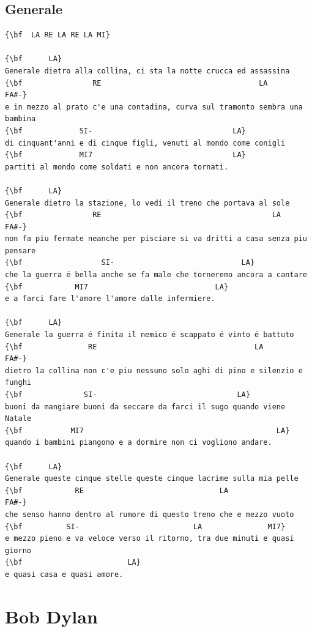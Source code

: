 \documentclass[a4paper]{article}
\begin{document}
\subsection{Generale}
\begin{Verbatim}[commandchars=\\\{\}]
{\bf  LA RE LA RE LA MI}

{\bf      LA}
Generale dietro alla collina, ci sta la notte crucca ed assassina
{\bf                RE                                    LA                  FA#-}
e in mezzo al prato c'e una contadina, curva sul tramonto sembra una bambina
{\bf             SI-                                LA}
di cinquant'anni e di cinque figli, venuti al mondo come conigli
{\bf             MI7                                LA}
partiti al mondo come soldati e non ancora tornati.

{\bf      LA}
Generale dietro la stazione, lo vedi il treno che portava al sole
{\bf                RE                                       LA                FA#-}
non fa piu fermate neanche per pisciare si va dritti a casa senza piu pensare
{\bf                  SI-                             LA}
che la guerra é bella anche se fa male che torneremo ancora a cantare
{\bf            MI7                             LA}
e a farci fare l'amore l'amore dalle infermiere.

{\bf      LA}
Generale la guerra é finita il nemico é scappato é vinto é battuto
{\bf               RE                                    LA                FA#-}
dietro la collina non c'e piu nessuno solo aghi di pino e silenzio e funghi
{\bf              SI-                                LA}
buoni da mangiare buoni da seccare da farci il sugo quando viene Natale
{\bf           MI7                                            LA}
quando i bambini piangono e a dormire non ci vogliono andare.

{\bf      LA}
Generale queste cinque stelle queste cinque lacrime sulla mia pelle
{\bf            RE                               LA                FA#-}
che senso hanno dentro al rumore di questo treno che e mezzo vuoto
{\bf          SI-                          LA               MI7}
e mezzo pieno e va veloce verso il ritorno, tra due minuti e quasi giorno
{\bf                        LA}
e quasi casa e quasi amore.

\end{Verbatim}
\newpage
\section{Bob Dylan}
\end{document}
